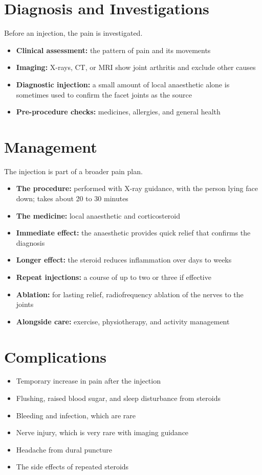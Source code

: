 \section*{Diagnosis and Investigations}
Before an injection, the pain is investigated.
\begin{itemize}
    \item \textbf{Clinical assessment:} the pattern of pain and its movements
    \item \textbf{Imaging:} X-rays, CT, or MRI show joint arthritis and exclude other causes
    \item \textbf{Diagnostic injection:} a small amount of local anaesthetic alone is sometimes used to confirm the facet joints as the source
    \item \textbf{Pre-procedure checks:} medicines, allergies, and general health
\end{itemize}

\section*{Management}
The injection is part of a broader pain plan.
\begin{itemize}
    \item \textbf{The procedure:} performed with X-ray guidance, with the person lying face down; takes about 20 to 30 minutes
    \item \textbf{The medicine:} local anaesthetic and corticosteroid
    \item \textbf{Immediate effect:} the anaesthetic provides quick relief that confirms the diagnosis
    \item \textbf{Longer effect:} the steroid reduces inflammation over days to weeks
    \item \textbf{Repeat injections:} a course of up to two or three if effective
    \item \textbf{Ablation:} for lasting relief, radiofrequency ablation of the nerves to the joints
    \item \textbf{Alongside care:} exercise, physiotherapy, and activity management
\end{itemize}

\section*{Complications}
\begin{itemize}
    \item Temporary increase in pain after the injection
    \item Flushing, raised blood sugar, and sleep disturbance from steroids
    \item Bleeding and infection, which are rare
    \item Nerve injury, which is very rare with imaging guidance
    \item Headache from dural puncture
    \item The side effects of repeated steroids
\end{itemize}


